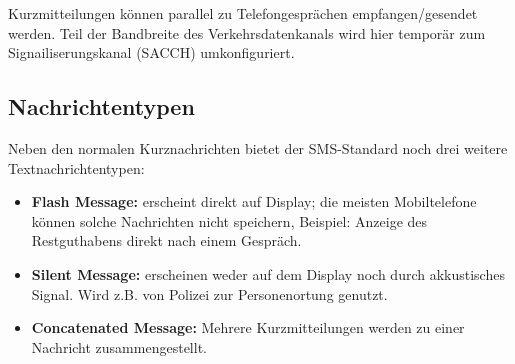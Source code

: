 \documentclass[german,12pt,a4paper]{article}
\begin{document}
Kurzmitteilungen können parallel zu Telefongesprächen empfangen/gesendet werden. Teil der Bandbreite des 
Verkehrsdatenkanals wird hier temporär zum Signailiserungskanal (SACCH) umkonfiguriert.

\subsection{Nachrichtentypen}
Neben den normalen Kurznachrichten bietet der SMS-Standard noch drei weitere Textnachrichtentypen:
\begin{itemize}
	\item \textbf{Flash Message:} erscheint direkt auf Display; die meisten Mobiltelefone können solche Nachrichten nicht speichern,
		Beispiel: Anzeige des Restguthabens direkt nach einem Gespräch.
	\item \textbf{Silent Message:} erscheinen weder auf dem Display noch durch akkustisches Signal. 
		Wird z.B. von Polizei zur Personenortung genutzt.
	\item \textbf{Concatenated Message:} Mehrere Kurzmitteilungen werden zu einer Nachricht zusammengestellt.
\end{itemize}


\end{document}

